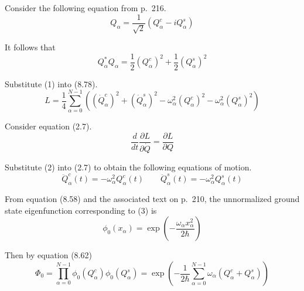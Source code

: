 


\bigskip
Consider the following equation from p.~216.
\begin{equation*}
Q_\alpha=\frac{1}{\sqrt2}(Q_\alpha^c-iQ_\alpha^s)
\end{equation*}

It follows that
\begin{equation*}
Q_\alpha^*Q_\alpha
=\frac{1}{2}(Q_\alpha^c)^2+\frac{1}{2}(Q_\alpha^s)^2
\tag{1}
\end{equation*}

Substitute (1) into (8.78).
\begin{equation*}
L=\frac{1}{4}\sum_{\alpha=0}^{N-1}
\left(
(\dot Q_\alpha^c)^2
+(\dot Q_\alpha^s)^2
-\omega_\alpha^2(Q_\alpha^c)^2
-\omega_\alpha^2(Q_\alpha^s)^2
\right)
\tag{2}
\end{equation*}

Consider equation (2.7).
\begin{equation*}
\frac{d}{dt}\frac{\partial L}{\partial\dot Q}=\frac{\partial L}{\partial Q}
\tag{2.7}
\end{equation*}

Substitute (2) into (2.7) to obtain the following equations of motion.
\begin{equation*}
\ddot Q_\alpha^c(t)=-\omega_\alpha^2Q_\alpha^c(t)
\qquad
\ddot Q_\alpha^s(t)=-\omega_\alpha^2Q_\alpha^s(t)
\tag{3}
\end{equation*}

From equation (8.58) and the associated text on p.~210,
the unnormalized ground state eigenfunction corresponding to (3) is
\begin{equation*}
\phi_0(x_\alpha)=\exp\left(-\frac{\omega_\alpha x_\alpha^2}{2\hbar}\right)
\end{equation*}

Then by equation (8.62)
\begin{equation*}
\Phi_0=\prod_{\alpha=0}^{N-1}\phi_0(Q_\alpha^c)\phi_0(Q_\alpha^s)
=\exp\left(-\frac{1}{2\hbar}\sum_{\alpha=0}^{N-1}\omega_\alpha(Q_\alpha^c+Q_\alpha^s)\right)
\end{equation*}


